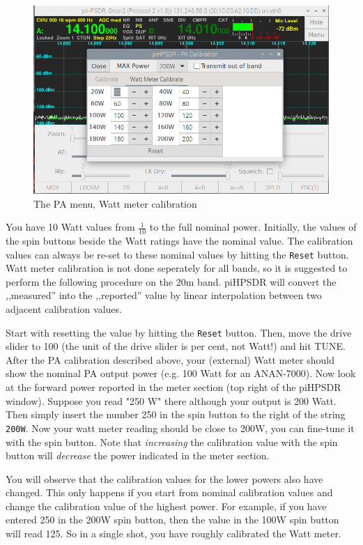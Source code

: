 \documentclass[12pt]{book}
\def\rett#1{\texttt{\color{red}#1}}
\begin{document}
\begin{figure}[ht]
\center
\includegraphics[width=12cm]{PAMenuWatt.png}
\caption{The PA menu, Watt meter calibration}
\label{fig:PAMenuWatt}
\end{figure}

You have 10 Watt values from $\frac{1}{10}$ to the full nominal power. Initially,
the values of the spin buttons beside the Watt ratings have the nominal value.
The calibration values can always be re-set to these nominal values by hitting
the \rett{Reset} button. Watt meter calibration is not done seperately for all
bands, so it is suggested to perform the following procedure on the 20m band.
piHPSDR will convert the ,,measured'' into the ,,reported'' value by linear
interpolation between two adjacent calibration values.

Start with resetting the value by hitting the \rett{Reset} button. Then, move the
drive slider to 100 (the unit of the drive slider is per cent, not Watt!) and hit
TUNE. After the PA calibration described above, your (external) Watt meter should
show the nominal PA output power (e.g. 100 Watt for an ANAN-7000). Now look at the
forward power reported in the meter section (top right of the piHPSDR window).
Suppose you read "250 W" there although your output is 200 Watt. Then simply
insert the number 250 in the spin button to the right of the string
\rett{200W}. Now your watt meter reading should be close to 200W, you can fine-tune
it with the spin button. Note that \textit{increasing} the calibration value
with the spin button will \textit{decrease} the power indicated in the meter section.

You will observe that the calibration values for the lower powers also have changed.
This only happens if you start from nominal calibration values and change the
calibration value of the highest power. For example, if you have entered 250 in
the 200W spin button, then the value in the 100W spin button will read 125. So in a
single shot, you have roughly calibrated the Watt meter.
\end{document}
